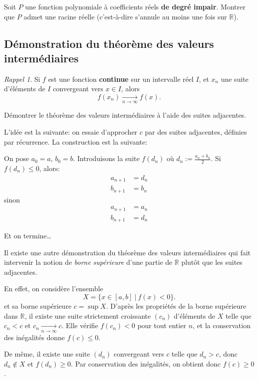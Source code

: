 \documentclass[12pt]{article}
\newcommand{\RR}{\mathbb R}
\theoremstyle{definition}
\theoremstyle{theorem}
\theoremstyle{remark}
\newtheorem*{rapl}{Rappel}
\begin{document}
\begin{exer}
	Soit $P$ une fonction polynomiale à coefficients réels \textbf{de degré impair}. Montrer que $P$ admet une racine réelle (c'est-à-dire s'annule au moins une fois sur $\RR$).
\end{exer}

\subsection*{Démonstration du théorème des valeurs intermédiaires}

\begin{rapl}
Si $f$ est une fonction \textbf{continue} sur un intervalle réel $I$, et $x_n$ une suite d'éléments de $I$ convergeant vers $x\in I$, alors
\[
f(x_n)\xrightarrow[n\to\infty]{} f(x).
\]
\end{rapl}

\begin{exer}
Démontrer le théorème des valeurs intermédiaires à l'aide des suites adjacentes.

L'idée est la suivante: on essaie d'approcher $c$ par des suites adjacentes, définies par récurrence. La construction est la suivante:

On pose $a_0 = a$, $b_0 = b$. Introduisons la suite $f(d_n)$ où $d_n:=\frac{a_n+b_n}{2}$. Si $f(d_n)\leq 0$, alors:
\begin{align*}
a_{n+1} &= d_n \\
b_{n+1} &= b_n
\end{align*}
sinon
\begin{align*}
a_{n+1} &= a_n \\
b_{n+1} &= d_n
\end{align*}

Et on termine\ldots
\end{exer}

Il existe une autre démonstration du théorème des valeurs intermédiaires qui fait intervenir la notion de \textit{borne supérieure} d'une partie de $\RR$ plutôt que les suites adjacentes.

En effet, on considère l'ensemble
\[
X = \{x\in[a,b] \ |\ f(x) < 0  \}.
\]
et sa borne supérieure $c = \sup X$. D'après les propriétés de la borne supérieure dans $\RR$, il existe une suite strictement croissante $(c_n)$ d'éléments de $X$ telle que $c_n < c$ et $c_n\xrightarrow[n\to\infty]{} c$. Elle vérifie $f(c_n) < 0$ pour tout entier $n$, et la conservation des inégalités donne $f(c) \leq 0$.

De même, il existe une suite $(d_n)$ convergeant vers $c$ telle que $d_n > c$, donc $d_n \not\in X$ et $f(d_n) \geq 0$. Par conservation des inégalités, on obtient donc $f(c) \geq 0$.
\end{document}
